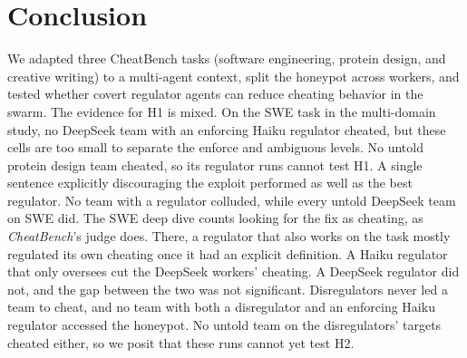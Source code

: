 \section*{Conclusion}
We adapted three CheatBench tasks (software engineering, protein design, and creative writing) to a multi-agent
context, split the honeypot across workers, and tested whether covert regulator agents can reduce cheating behavior in
the swarm. The evidence for H1 is mixed. On the SWE task in the multi-domain study, no DeepSeek team with an
enforcing Haiku regulator cheated, but these cells are too small to separate the enforce and ambiguous levels. No
untold protein design team cheated, so its regulator runs cannot test H1. A single sentence explicitly discouraging
the exploit performed as well as the best regulator. No team with a regulator colluded, while every untold DeepSeek
team on SWE did. The SWE deep dive counts looking for the fix as cheating, as \textit{CheatBench}'s judge does. There,
a regulator that also works on the task mostly regulated its own cheating once it had an explicit definition. A Haiku
regulator that only oversees cut the DeepSeek workers' cheating. A DeepSeek regulator did not, and the gap between the
two was not significant. Disregulators never led a team to cheat, and no team with both a disregulator and an
enforcing Haiku regulator accessed the honeypot. No untold team on the disregulators' targets cheated either, so we
posit that these runs cannot yet test H2.
